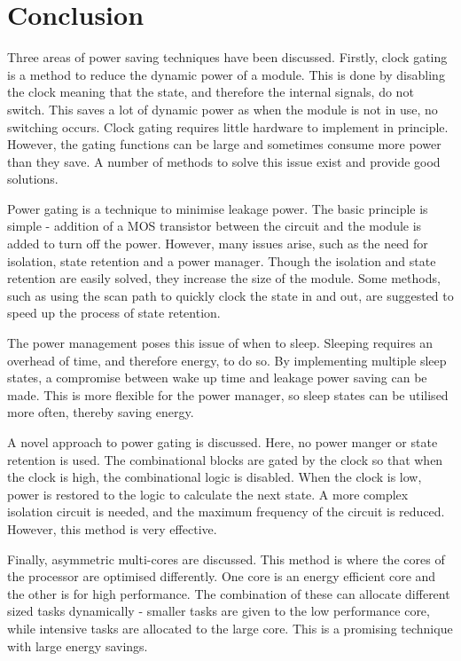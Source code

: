 
\section{Conclusion}

Three areas of power saving techniques have been discussed. 
Firstly, clock gating is a method to reduce the dynamic power of a module. 
This is done by disabling the clock meaning that the state, and therefore the internal signals, do not switch. 
This saves a lot of dynamic power as when the module is not in use, no switching occurs. 
Clock gating requires little hardware to implement in principle. 
However, the gating functions can be large and sometimes consume more power than they save. 
A number of methods to solve this issue exist and provide good solutions.


Power gating is a technique to minimise leakage power.
The basic principle is simple - addition of a MOS transistor between the circuit and the module is added to turn off the power.
However, many issues arise, such as the need for isolation, state retention and a power manager.
Though the isolation and state retention are easily solved, they increase the size of the module. 
Some methods, such as using the scan path to quickly clock the state in and out, are suggested to speed up the process of state retention. 

The power management poses this issue of when to sleep. 
Sleeping requires an overhead of time, and therefore energy, to do so. 
By implementing multiple sleep states, a compromise between wake up time and leakage power saving can be made. 
This is more flexible for the power manager, so sleep states can be utilised more often, thereby saving energy.

A novel approach to power gating is discussed. 
Here, no power manger or state retention is used. 
The combinational blocks are gated by the clock so that when the clock is high, the combinational logic is disabled. 
When the clock is low, power is restored to the logic to calculate the next state. 
A more complex isolation circuit is needed, and the maximum frequency of the circuit is reduced. 
However, this method is very effective.

Finally, asymmetric multi-cores are discussed.
This method is where the cores of the processor are optimised differently.
One core is an energy efficient core and the other is for high performance. 
The combination of these can allocate different sized tasks dynamically - smaller tasks are given to the low performance core, while intensive tasks are allocated to the large core.
This is a promising technique with large energy savings.

